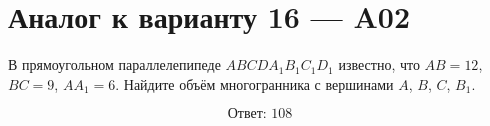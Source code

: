 \documentclass[12pt,a4paper]{article}
\begin{document}
\section*{Аналог к варианту 16 — A02}

В прямоугольном параллелепипеде \(ABCDA_1B_1C_1D_1\) известно, что \(AB=12\), \(BC=9\), \(AA_1=6\). Найдите объём многогранника с вершинами \(A\), \(B\), \(C\), \(B_1\).

\begin{center}
\end{center}

\[
\boxed{\text{Ответ: }108}
\]
\end{document}
